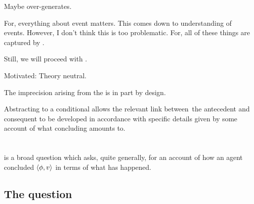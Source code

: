 \begin{note}
  \begin{observation}
    Maybe over-generates.

    For, everything about event matters.
    This comes down to understanding of events.
    However, I don't think this is too problematic.
    For, all of these things are captured by \qHow{}.
  \end{observation}

\end{note}

\begin{note}
  Still, we will proceed with \qWhyV{}.

  Motivated:
  Theory neutral.

  The imprecision arising from the \itc{} is in part by design.

  Abstracting to a conditional allows the relevant link between~the antecedent and consequent to be developed in accordance with specific details given by some account of what concluding amounts to.
\end{note}


\section{\qHowV{}}
\label{cha:var:qhowv}

\begin{note}
  \qHow{} is a broad question which asks, quite generally, for an account of how an agent concluded \(\langle \phi, v \rangle\) in terms of what has happened.
\end{note}

\subsection{The question}
\label{cha:var:qhowv:question}

